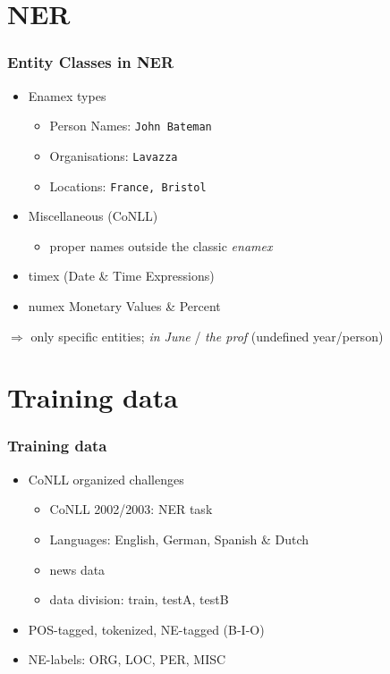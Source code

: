 \documentclass[10pt]{beamer}
\begin{document}

\section{NER}

\begin{frame}
\frametitle{Entity Classes in NER}

\begin{itemize}
 \item Enamex types
\begin{itemize}
 \item Person Names: \texttt{John Bateman}
 \item Organisations: \texttt{Lavazza}
 \item Locations: \texttt{France, Bristol}
\end{itemize}

 \item Miscellaneous (CoNLL)
 \begin{itemize}
  \item  proper names outside the classic \emph{enamex}
 \end{itemize}

 \item timex (Date \& Time Expressions)
 
\item numex Monetary Values \& Percent
\end{itemize}        

$\Rightarrow$ only specific entities; \emph{in June} / \emph{the prof} (undefined year/person) %
 \end{frame}


\section{Training data}
\begin{frame}
\frametitle{Training data}


\begin{itemize}
        \item CoNLL organized challenges
        \begin{itemize}
         \item CoNLL 2002/2003:  NER task
         \item Languages: English, German, Spanish \& Dutch
         \item news data 
         \item data division: train, testA, testB
        \end{itemize}
        \item POS-tagged, tokenized, NE-tagged (B-I-O)
    \item NE-labels: ORG, LOC, PER, MISC 
\end{itemize}
\end{frame}
\end{document}
